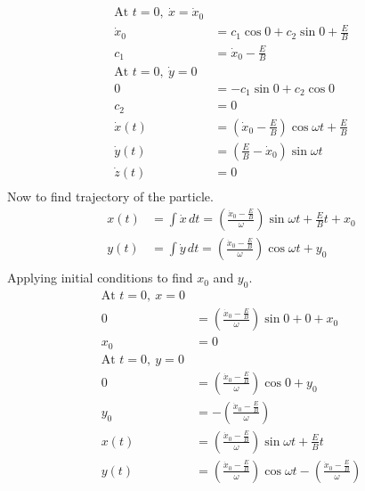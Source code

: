 \documentclass[]{article}
\begin{document}
	\begin{equation}
		\begin{split}
			\text{At } t = 0 , \  \dot{x} = \dot{x}_0 \\
			\dot{x}_0 &= c_1 \cos 0 + c_2 \sin 0 + \frac{E}{B} \\
			c_1 &= \dot{x}_0 - \frac{E}{B} \\
			\text{At } t = 0 , \  \dot{y} = 0 \\
			0 &= -c_1 \sin 0 + c_2 \cos 0 \\
			c_2 &= 0 \\
			\dot{x}(t) &= \left( \dot{x}_0 - \frac{E}{B} \right) \cos \omega t + \frac{E}{B} \\
			\dot{y}(t) &= \left( \frac{E}{B} - \dot{x}_0 \right) \sin \omega t \\
			\dot{z}(t) &= 0 \\
		\end{split}
	\end{equation}	
	Now to find trajectory of the particle.
	\begin{equation}
		\begin{split}
			x(t) &= \int \dot{x} \, dt = \left( \frac{\dot{x}_0 - \frac{E}{B}}{\omega} \right) \sin \omega t + \frac{E}{B}t + x_0 \\
			y(t) &= \int \dot{y} \, dt = \left( \frac{\dot{x}_0 - \frac{E}{B}}{\omega} \right) \cos \omega t + y_0 \\
		\end{split}
	\end{equation}
	Applying initial conditions to find $x_0$ and $y_0$.
	\begin{equation}
		\begin{split}
			\text{At } t = 0 , \ x = 0 \\
			0 &= \left( \frac{\dot{x}_0 - \frac{E}{B}}{\omega} \right) \sin 0 + 0 + x_0 \\
			x_0 &= 0 \\
			\text{At } t = 0 , \ y = 0 \\
			0 &= \left( \frac{\dot{x}_0 - \frac{E}{B}}{\omega} \right) \cos 0 + y_0 \\
			y_0 &= - \left( \frac{\dot{x}_0 - \frac{E}{B}}{\omega} \right) \\
			x(t) &= \left( \frac{\dot{x}_0 - \frac{E}{B}}{\omega} \right) \sin \omega t + \frac{E}{B}t \\
			y(t) &= \left( \frac{\dot{x}_0 - \frac{E}{B}}{\omega} \right) \cos \omega t - \left( \frac{\dot{x}_0 - \frac{E}{B}}{\omega} \right) \\
		\end{split}
	\end{equation}
\end{document}
